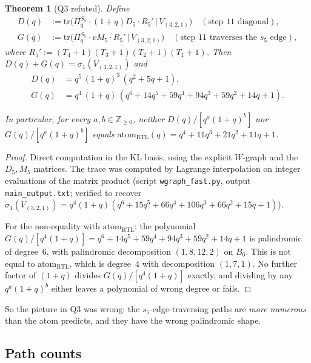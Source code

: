 \documentclass[11pt]{article}
\newtheorem{theorem}{Theorem}
\theoremstyle{definition}
\begin{document}
\begin{theorem}[Q3 refuted]\label{thm:Q3-refuted}
Define
\begin{align*}
D(q) &:= \mathrm{tr}\bigl(\Pi_q^{S_5} \cdot (1+q)D_5 \cdot R_5'\,|\,V_{(3,2,1)}\bigr) \quad (\text{step 11 diagonal}),\\
G(q) &:= \mathrm{tr}\bigl(\Pi_q^{S_5} \cdot v M_5 \cdot R_5'\,|\,V_{(3,2,1)}\bigr) \quad (\text{step 11 traverses the $s_5$ edge}),
\end{align*}
where $R_5' := (T_4+1)(T_3+1)(T_2+1)(T_1+1)$. Then $D(q) + G(q) = \sigma_1(V_{(3,2,1)})$ and
\begin{align*}
D(q) &= q^5\,(1+q)^3\,(q^2 + 5q + 1), \\
G(q) &= q^4\,(1+q)\,(q^6 + 14q^5 + 59q^4 + 94q^3 + 59q^2 + 14q + 1).
\end{align*}

In particular, for every $a, b \in \mathbb{Z}_{\geq 0}$, neither $D(q)/[q^a(1+q)^b]$ nor $G(q)/[q^a(1+q)^b]$ equals $\mathrm{atom}_{\mathrm{RTL}}(q) = q^4 + 11q^3 + 21q^2 + 11q + 1$.
\end{theorem}

\begin{proof}
Direct computation in the KL basis, using the explicit $W$-graph and the $D_5, M_5$ matrices. The trace was computed by Lagrange interpolation on integer evaluations of the matrix product (script \texttt{wgraph\_fast.py}, output \texttt{main\_output.txt}; verified to recover $\sigma_1(V_{(3,2,1)}) = q^4(1+q)(q^6 + 15q^5 + 66q^4 + 106q^3 + 66q^2 + 15q + 1)$).

For the non-equality with $\mathrm{atom}_{\mathrm{RTL}}$: the polynomial $G(q)/[q^4(1+q)] = q^6+14q^5+59q^4+94q^3+59q^2+14q+1$ is palindromic of degree~6, with palindromic decomposition $(1, 8, 12, 2)$ on $B_6$. This is not equal to $\mathrm{atom}_{\mathrm{RTL}}$, which is degree~4 with decomposition $(1, 7, 1)$. No further factor of $(1+q)$ divides $G(q)/[q^4(1+q)]$ exactly, and dividing by any $q^a(1+q)^b$ either leaves a polynomial of wrong degree or fails. \qedhere
\end{proof}

So the picture in Q3 was wrong: the $s_5$-edge-traversing paths are \emph{more numerous} than the atom predicts, and they have the wrong palindromic shape.

\subsection*{Path counts}
\end{document}
